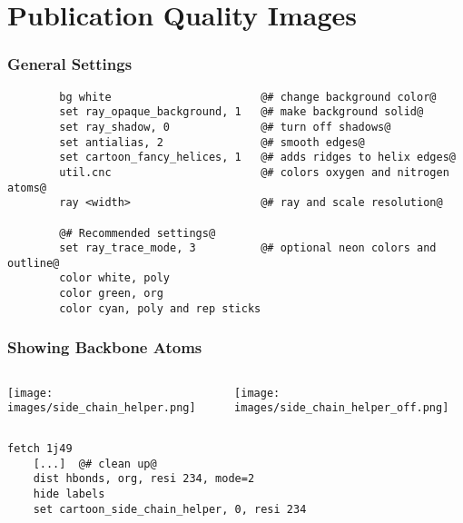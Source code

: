 \documentclass[aspectratio=169]{beamer}
\begin{document}
\section{Publication Quality Images}
\begin{frame}[fragile]
\frametitle{General Settings}
    \begin{lstlisting}
        bg white                       @# change background color@
        set ray_opaque_background, 1   @# make background solid@
        set ray_shadow, 0              @# turn off shadows@
        set antialias, 2               @# smooth edges@
        set cartoon_fancy_helices, 1   @# adds ridges to helix edges@
        util.cnc                       @# colors oxygen and nitrogen atoms@
        ray <width>                    @# ray and scale resolution@

        @# Recommended settings@
        set ray_trace_mode, 3          @# optional neon colors and outline@
        color white, poly
        color green, org
        color cyan, poly and rep sticks

    \end{lstlisting}
\end{frame}

\begin{frame}[fragile]
\frametitle{Showing Backbone Atoms}
    \begin{columns}
        \begin{column}{0.50\textwidth}
            \texttt{[image: images/side\_chain\_helper.png]}
        \end{column}
        \begin{column}{0.50\textwidth}
            \texttt{[image: images/side\_chain\_helper\_off.png]}
        \end{column}
    \end{columns}
    \begin{lstlisting}[xleftmargin=0.2\textwidth]
    fetch 1j49
    [...]  @# clean up@
    dist hbonds, org, resi 234, mode=2
    hide labels
    set cartoon_side_chain_helper, 0, resi 234
    \end{lstlisting}

\end{frame}
\end{document}
